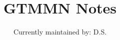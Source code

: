 \documentclass[10pt,twocolumn]{article}
\begin{document}
\title{\Huge \bf GTMMN Notes}
\author{\large Currently maintained by: D.S.}

\maketitle



% 
% 
% 
% 
% 
% 
% 
% 


\printbibliography
\end{document}
